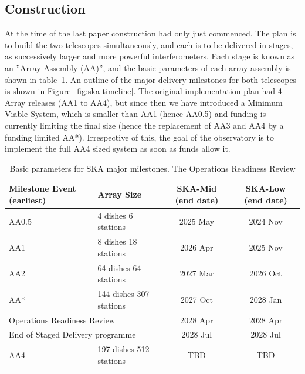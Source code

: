 \documentclass[a4paper,
               biblatex,     %
               keeplastbox,   %
               ]{jacow}
\begin{document}
\subsection{Construction}
At the time of the last paper construction had only just commenced. The plan is to build the two telescopes simultaneously, and each is to be delivered in stages, as successively larger and more powerful interferometers. Each stage is known as an ''Array Assembly (AA)'', and the basic parameters of each array assembly is shown in table~\ref{tab:array-assemblies}. An outline of the major delivery milestones for both telescopes is shown in Figure~\ref{fig:ska-timeline}. The original implementation plan had 4 Array releases (AA1 to AA4), but since then we have introduced a Minimum Viable System, which is smaller than AA1 (hence AA0.5) and funding is currently limiting the final size (hence the replacement of AA3 and AA4 by a funding limited AA*). Irrespective of this, the goal of the observatory is to implement the full AA4 sized system as soon as funds allow it.

\begin{table}[tb]
	\centering
	\caption{Basic parameters for SKA major milestones. The Operations Readiness Review }
        \begin{tabular}{llcc}
            \toprule
            Milestone Event (earliest) & Array Size & SKA-Mid (end date) & SKA-Low (end date)\\
            \midrule
            AA0.5 & 4 dishes 6 stations   & 2025 May & 2024 Nov\\
            AA1   & 8 dishes 18 stations  & 2026 Apr & 2025 Nov\\
            AA2   & 64 dishes 64 stations & 2027 Mar & 2026 Oct\\
            AA* & 144 dishes 307 stations & 2027 Oct & 2028 Jan\\
            \multicolumn{2}{l}{Operations Readiness Review} & 2028 Apr & 2028 Apr\\
            \multicolumn{2}{l}{End of Staged Delivery programme} & 2028 Jul & 2028 Jul\\
            AA4 & 197 dishes 512 stations & TBD & TBD\\
            \bottomrule
        \end{tabular}
	\label{tab:array-assemblies}
 \end{table}
\end{document}
